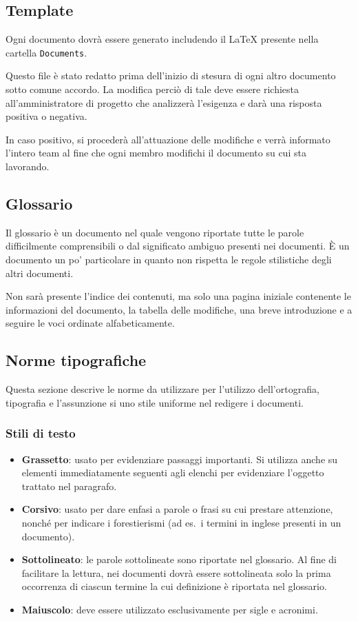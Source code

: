 \subsection{Template}
Ogni documento dovrà essere generato includendo il  \LaTeX{} presente nella cartella \verb+Documents+.

Questo file è stato redatto prima dell'inizio di stesura di ogni altro documento sotto comune accordo. La modifica perciò di tale  deve essere richiesta all'amministratore di progetto che analizzerà l'esigenza e darà una risposta positiva o negativa.

In caso positivo, si procederà all'attuazione delle modifiche e verrà informato l'intero team al fine che ogni membro modifichi il documento su cui sta lavorando.

\subsection{Glossario}
Il glossario è un documento nel quale vengono riportate tutte le parole difficilmente comprensibili o dal significato ambiguo presenti nei documenti. È un documento un po' particolare in quanto non rispetta le regole stilistiche degli altri documenti.

Non sarà presente l'indice dei contenuti, ma solo una pagina iniziale contenente le informazioni del documento, la tabella delle modifiche, una breve introduzione e a seguire le voci ordinate alfabeticamente.

\subsection{Norme tipografiche}
Questa sezione descrive le norme da utilizzare per l'utilizzo dell'ortografia, tipografia e l'assunzione si uno stile uniforme nel redigere i documenti.

\subsubsection{Stili di testo}
\begin{itemize}
\item \textbf{Grassetto}: usato per evidenziare passaggi importanti. Si utilizza anche su elementi immediatamente seguenti agli elenchi per evidenziare l'oggetto trattato nel paragrafo.
\item \textbf{Corsivo}: usato per dare enfasi a parole o frasi su cui prestare attenzione, nonché per indicare i forestierismi (ad es.~i termini in inglese presenti in un documento).
\item \textbf{Sottolineato}: le parole sottolineate sono riportate nel glossario. Al fine di facilitare la lettura, nei documenti dovrà essere sottolineata solo la prima occorrenza di ciascun termine la cui definizione è riportata nel glossario.
\item \textbf{Maiuscolo}: deve essere utilizzato esclusivamente per sigle e acronimi.
\end{itemize}

